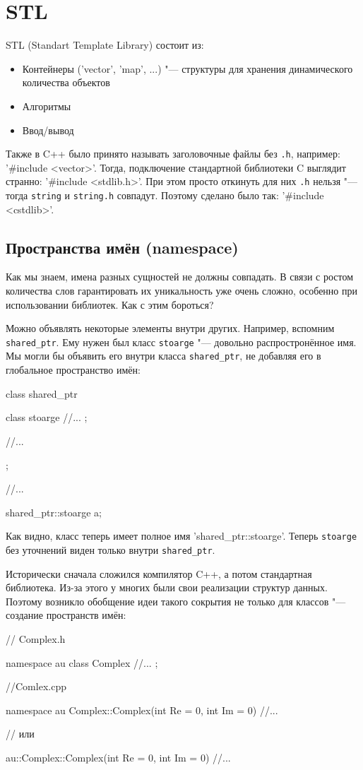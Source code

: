  \chapter{STL}
STL (Standart Template Library) состоит из:
\begin{itemize}
        \item Контейнеры (\cpp'vector', \cpp'map', ...) "--- структуры для хранения динамического количества объектов
        \item Алгоритмы
        \item Ввод/вывод
\end{itemize}
 
Также в C++ было принято называть заголовочные файлы без \verb'.h', например: \cpp'#include <vector>'.
Тогда, подключение стандартной библиотеки C выглядит странно: \cpp'#include <stdlib.h>'.
При этом просто откинуть для них \verb'.h' нельзя "--- тогда \verb'string' и \verb'string.h' совпадут.
Поэтому сделано было так: \cpp'#include <cstdlib>'.
 
\section{Пространства имён (namespace)}
 
Как мы знаем, имена разных сущностей не должны совпадать. В связи с ростом количества слов гарантировать их уникальность уже очень сложно, особенно при использовании библиотек. Как с этим бороться?
 
Можно объявлять некоторые элементы внутри других.
Например, вспомним \verb'shared_ptr'.
Ему нужен был класс \verb'stoarge' "--- довольно распростронённое имя.
Мы могли бы объявить его внутри класса \verb'shared_ptr', не добавляя его в глобальное пространство имён:
\begin{cppcode}
class shared_ptr
{
        class stoarge
        {
                //...
        };
 
        //...
};
 
//...
 
shared_ptr::stoarge a;
\end{cppcode}
Как видно, класс теперь имеет полное имя \cpp'shared_ptr::stoarge'.
Теперь \verb'stoarge' без уточнений виден только внутри \verb'shared_ptr'.
 
Исторически сначала сложился компилятор C++, а потом стандартная библиотека. Из-за этого у многих были свои реализации структур данных.
Поэтому возникло обобщение идеи такого сокрытия не только для классов "--- создание пространств имён:
\begin{cppcode}
// Complex.h
 
namespace au
{
        class Complex
        {
                //...
        };
}
 
//Comlex.cpp
 
namespace au
{
        Complex::Complex(int Re = 0, int Im = 0)
        {
                //...
        }
}
 
// или
 
au::Complex::Complex(int Re = 0, int Im = 0)
{
        //...
}
\end{cppcode}
 
